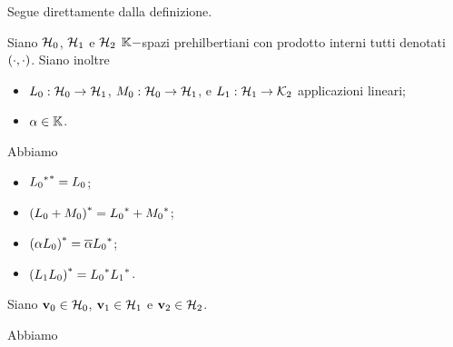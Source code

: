 \Proof Segue direttamente dalla definizione. \EndProof
\begin{Corollary}
  Siano $\mathcal{H}_0$, $\mathcal{H}_1$ e $\mathcal{H}_2$
  $\mathbb{K}-$spazi prehilbertiani con prodotto interni tutti denotati
  $\left ( \cdot , \cdot \right )$.
  Siano inoltre
  \begin{itemize}
    \item $L_0: \mathcal{H}_0 \rightarrow \mathcal{H}_1$,
      $M_0: \mathcal{H}_0 \rightarrow \mathcal{H}_1$,
      e $L_1: \mathcal{H}_1 \rightarrow \mathcal{K}_2$
      applicazioni lineari;
    \item $\alpha \in \mathbb{K}$.
  \end{itemize}
  Abbiamo
  \begin{itemize}
    \item ${{L_0}^*}^* = L_0$;
    \item ${(L_0 + M_0)}^*
            = {L_0}^* + {M_0}^*$;
    \item ${(\alpha L_0)}^* = \overline{\alpha}{L_0}^*$;
    \item ${(L_1L_0)}^*
            = {L_0}^*{L_1}^*$.
  \end{itemize}
\end{Corollary}
\Proof Siano $\mathbf{v}_0 \in \mathcal{H}_0$,
$\mathbf{v}_1 \in \mathcal{H}_1$ e $\mathbf{v}_2 \in \mathcal{H}_2$.
\par Abbiamo
